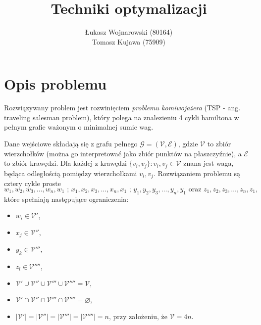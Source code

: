 \documentclass{article}
\author{Łukasz Wojnarowski (80164)\\ Tomasz Kujawa (75909)}
\title{Techniki optymalizacji}
\begin{document}
\pagestyle{empty}
\pagestyle{fancy}
\renewcommand{\sectionmark}[1]{\markright{\thesection \quad #1}}
\fancyhf{}
\fancyhead[LE,RO]{\small\bfseries\thepage}
\fancyhead[LO]{\small\bfseries\rightmark}
\renewcommand{\headrulewidth}{0.5pt}
\renewcommand{\footrulewidth}{0pt}
\addtolength{\headheight}{0.5pt}
\fancypagestyle{plain}{
\fancyhead{}
\renewcommand{\headrulewidth}{0pt}
}

\maketitle
\newpage
\tableofcontents %
\newpage

\section{Opis problemu}
Rozwiązywany problem jest rozwinięciem \emph{problemu komiwojażera} (TSP - ang. traveling salesman problem), który polega na znalezieniu 4 cykli hamiltona w pełnym grafie ważonym o minimalnej sumie wag.

Dane wejściowe składają się z grafu pełnego $\mathcal{G}=(\mathcal{V},\mathcal{E})$, gdzie $\mathcal{V}$ to zbiór wierzchołków (można go interpretować jako zbiór punktów na płaszczyźnie), a $\mathcal{E}$ to zbiór krawędzi.
Dla każdej z krawędzi $\{v_i,v_j\} \colon v_i,v_j \in \mathcal{V}$ znana jest waga, będąca odległością pomiędzy wierzchołkami $v_i,v_j$. Rozwiązaniem problemu są cztery cykle proste
\begin{equation}
w_1,w_2,w_3,\ldots,w_n,w_1 \mbox{ ; }x_1,x_2,x_3,\ldots,x_n,x_1 \mbox{ ; } y_1,y_2,y_3,\ldots,y_n,y_1 \mbox{ oraz } z_1,z_2,z_3,\ldots,z_n,z_1,
\end{equation} które spełniają następujące ograniczenia:
\begin{itemize}
	\item $w_i \in \mathcal{V'}$,
	\item $x_j \in \mathcal{V''}$,
	\item $y_k \in \mathcal{V'''}$,
	\item $z_l \in \mathcal{V''''}$,
	\item $\mathcal{V'} \cup \mathcal{V''} \cup \mathcal{V'''} \cup \mathcal{V''''} = \mathcal{V}$,
	\item $\mathcal{V'} \cap \mathcal{V''} \cap \mathcal{V'''} \cap \mathcal{V''''} = \varnothing$,
	\item $|\mathcal{V'}| = |\mathcal{V''}| = |\mathcal{V'''}| = |\mathcal{V''''}| = n$, przy założeniu, że $\mathcal{V} = 4n$.
\end{itemize}
\end{document}
